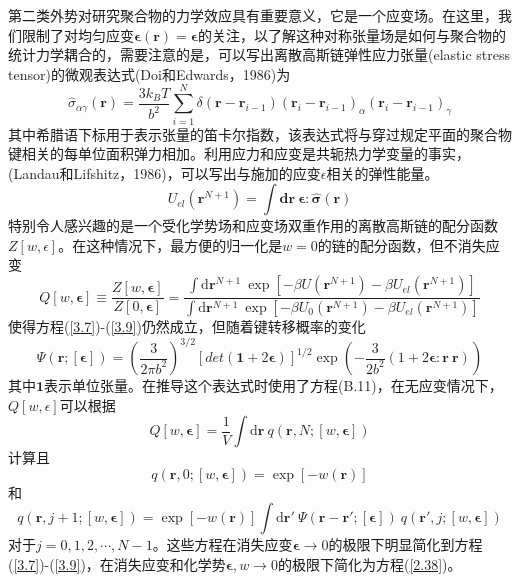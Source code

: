 第二类外势对研究聚合物的力学效应具有重要意义，它是一个应变场。在这里，我们限制了对均匀应变$\boldsymbol{\epsilon}(\mathbf{r})=\boldsymbol{\epsilon}$的关注，以了解这种对称张量场是如何与聚合物的统计力学耦合的，需要注意的是，可以写出离散高斯链弹性应力张量(elastic stress tensor)的微观表达式(Doi和Edwards，1986)为
\begin{equation}\label{3.11}
\hat{\sigma}_{\alpha\gamma}(\mathbf{r})=\frac{3k_BT}{b^2}\sum\limits_{i=1}^N\delta(\mathbf{r}-\mathbf{r}_{i-1})(\mathbf{r}_{i}-\mathbf{r}_{i-1})_{\alpha}(\mathbf{r}_i-\mathbf{r}_{i-1})_{\gamma}
\end{equation}
其中希腊语下标用于表示张量的笛卡尔指数，该表达式将与穿过规定平面的聚合物键相关的每单位面积弹力相加。利用应力和应变是共轭热力学变量的事实，(Landau和Lifshitz，1986)，可以写出与施加的应变$\epsilon$相关的弹性能量。
\begin{equation}\label{3.12}
U_{el}(\mathbf{r}^{N+1})=\int\mathbf{d}\mathbf{r}~\boldsymbol{\epsilon}:\hat{\boldsymbol{\sigma}}(\mathbf{r})
\end{equation}
特别令人感兴趣的是一个受化学势场和应变场双重作用的离散高斯链的配分函数$Z[w,\epsilon]$。在这种情况下，最方便的归一化是$w=0$的链的配分函数，但不消失应变
\begin{equation}\label{3.13}
Q[w,\boldsymbol{\epsilon}]\equiv\frac{Z[w,\boldsymbol{\epsilon}]}{Z[0,\boldsymbol{\epsilon}]}=\frac{\int\mathrm{d}\mathbf{r}^{N+1}~\exp[-\beta U(\mathbf{r}^{N+1})-\beta U_{el}(\mathbf{r}^{N+1})]}{\int\mathrm{d}\mathbf{r}^{N+1}~\exp[-\beta U_0(\mathbf{r}^{N+1})-\beta U_{el}(\mathbf{r}^{N+1})]}
\end{equation}
使得方程(\ref{3.7})-(\ref{3.9})仍然成立，但随着键转移概率的变化
\begin{equation}\label{3.14}
\Psi(\mathbf{r};[\boldsymbol{\epsilon}])=\left(\frac{3}{2\pi b^2}\right)^{3/2}[det(\boldsymbol{1}+2\boldsymbol{\epsilon})]^{1/2}\exp\left(-\frac{3}{2b^2}(1+2\boldsymbol{\epsilon}:\mathbf{r}~\mathbf{r})\right)
\end{equation}
其中$\boldsymbol{1}$表示单位张量。在推导这个表达式时使用了方程(B.11)，在无应变情况下，$Q[w,\epsilon]$可以根据
\begin{equation}\label{3.15}
Q[w,\boldsymbol{\epsilon}]=\frac{1}{V}\int\mathrm{d}\mathbf{r}~q(\mathbf{r},N;[w,\boldsymbol{\epsilon}])
\end{equation}
计算且
\begin{equation}\label{3.16}
q(\mathbf{r},0;[w,\boldsymbol{\epsilon}])=\exp[-w(\mathbf{r})]
\end{equation}
和
\begin{equation}\label{3.17}
q(\mathbf{r},j+1;[w,\boldsymbol{\epsilon}])=\exp[-w(\mathbf{r})]\int\mathrm{d}\mathbf{r}'~\Psi(\mathbf{r}-\mathbf{r}';[\boldsymbol{\epsilon}])~q(\mathbf{r}',j;[w,\boldsymbol{\epsilon}])
\end{equation}
对于$j=0,1,2,\cdots,N-1$。这些方程在消失应变$\boldsymbol{\epsilon}\rightarrow 0$的极限下明显简化到方程(\ref{3.7})-(\ref{3.9})，在消失应变和化学势$\boldsymbol{\epsilon},w\rightarrow 0$的极限下简化为方程(\ref{2.38})。

